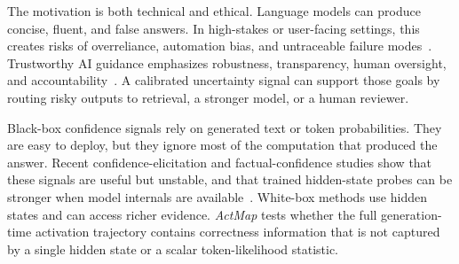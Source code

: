 \documentclass{article}
\newcommand{\actmap}{\textit{ActMap}}
\begin{document}
The motivation is both technical and ethical. Language models can produce concise, fluent, and false answers. In high-stakes or user-facing settings, this creates risks of overreliance, automation bias, and untraceable failure modes~\cite{weidinger2021}. Trustworthy AI guidance emphasizes robustness, transparency, human oversight, and accountability~\cite{hleg2019,nist2023}. A calibrated uncertainty signal can support those goals by routing risky outputs to retrieval, a stronger model, or a human reviewer.

Black-box confidence signals rely on generated text or token probabilities. They are easy to deploy, but they ignore most of the computation that produced the answer. Recent confidence-elicitation and factual-confidence studies show that these signals are useful but unstable, and that trained hidden-state probes can be stronger when model internals are available~\cite{mahaut2024,xiong2024}. White-box methods use hidden states and can access richer evidence. \actmap{} tests whether the full generation-time activation trajectory contains correctness information that is not captured by a single hidden state or a scalar token-likelihood statistic.
\end{document}
